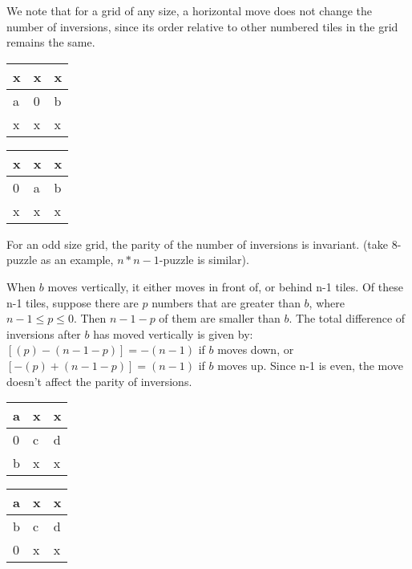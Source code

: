 \documentclass{llncs}
\begin{document}
We note that for a grid of any size, a horizontal move does not change the number of inversions, since its order relative to other numbered tiles in the grid remains the same.
\begin{table}
\label{tab1}
\begin{tabular}{|p{2cm}|p{2cm}|p{2cm}|}
\hline
x &  x & x\\
\hline
a & 0 & b\\
\hline
x & x & x\\
\hline
\end{tabular}
\end{table}
\begin{table}
\label{tab2}
\begin{tabular}{|p{2cm}|p{2cm}|p{2cm}|}
\hline
x &  x & x\\
\hline
0 & a & b\\
\hline
x & x & x\\
\hline
\end{tabular}
\end{table}
\begin{claim}
For an odd size grid, the parity of the number of inversions is invariant. (take 8-puzzle as an example, $n*n-1$-puzzle is similar).
\end{claim}
When $b$ moves vertically, it either moves in front of, or behind n-1 tiles.
Of these n-1 tiles, suppose there are $p$ numbers that are greater than $b$, where $n-1 \leq p \leq 0$. Then $n-1-p$ of them are smaller than $b$. The total difference of inversions after $b$ has moved vertically is given by:
$[(p)-(n-1-p)]= -(n-1)$ if $b$ moves down, or  $[-(p) +(n-1-p)]= (n-1)$ if $b$ moves up. Since n-1 is even, the move doesn’t affect the parity of inversions.
\begin{table}
\label{tab3}
\begin{tabular}{|p{2cm}|p{2cm}|p{2cm}|}
\hline
a &  x & x\\
\hline
0 & c & d\\
\hline
b & x & x\\
\hline
\end{tabular}
\end{table}
\begin{table}
\label{tab4}
\begin{tabular}{|p{2cm}|p{2cm}|p{2cm}|}
\hline
a &  x & x\\
\hline
b & c & d\\
\hline
0 & x & x\\
\hline
\end{tabular}
\end{table}
\end{document}
